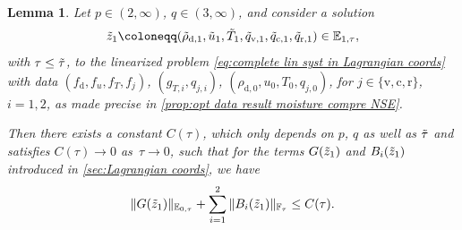 \documentclass[10pt]{amsart}
\theoremstyle{plain}
\newtheorem{lem}[lem]{Lemma}
\theoremstyle{definition}
\theoremstyle{thm}
\numberwithin{equation}{section}
\newcommand{\E}{\mathbb{E}}
\newcommand{\F}{\mathbb{F}}
\newcommand{\rd}{\mathrm{d}}
\newcommand{\rr}{\mathrm{r}}
\newcommand{\rv}{\mathrm{v}}
\newcommand{\rc}{\mathrm{c}}
\newcommand{\trho}{\Tilde{\rho}}
\newcommand{\tu}{\Tilde{u}}
\newcommand{\tz}{\Tilde{z}}
\newcommand{\tT}{\Tilde{T}}
\newcommand{\tq}{\Tilde{q}}
\begin{document}
\begin{lem}\label{lem: estimate non lin}
Let $p \in (2,\infty)$, $q \in (3,\infty)$, and consider a solution
\begin{equation*}
    \tz_1 \coloneqq (\trho_{\rd,1},\tu_1,\tT_1,\tq_{\rv,1},\tq_{\rc,1},\tq_{\rr,1}) \in \E_{1,\tau},
\end{equation*}
with $\tau \le \Tilde{\tau}$, to the linearized problem \eqref{eq:complete lin syst in Lagrangian coords} with data $(f_\rd,f_u,f_T,f_j)$, $(g_{T,i},q_{j,i})$, $(\rho_{\rd,0},u_0,T_0,q_{j,0})$, for $j \in \{\rv,\rc,\rr\}$, $i=1,2$, as made precise in \autoref{prop:opt data result moisture compre NSE}.

Then there exists a constant $C(\tau)$, which only depends on $p$, $q$ as well as $\Tilde{\tau}$ and satisfies $C(\tau) \to 0$ as~$\tau \to 0$, such that for the terms $G(\tz_1)$ and $B_i(\tz_1)$ introduced in \autoref{sec:Lagrangian coords}, we have
\begin{equation*}
    \| G(\tz_1) \|_{\E_{0,\tau}} + \sum_{i=1}^2 \| B_i(\tz_1) \|_{\F_\tau} \le C(\tau).
\end{equation*}
\end{lem}
\end{document}
